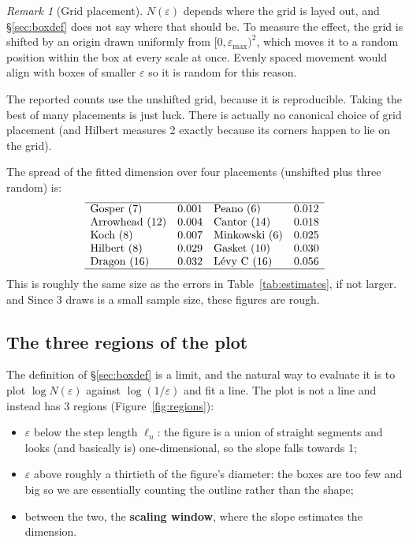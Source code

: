 \documentclass[11pt, a4paper]{article}
\theoremstyle{plain}
\theoremstyle{definition}
\theoremstyle{remark}
\newtheorem{remark}[theorem]{Remark}
\newcommand{\eps}{\varepsilon}
\begin{document}
\begin{remark}[Grid placement]
\label{rem:offsets}
    $N(\eps)$ depends where the grid is layed out, and \S\ref{sec:boxdef} does not say where that should be. 
    To measure the effect, the grid is shifted by an origin drawn uniformly from $[0,\eps_{\max})^2$, which moves it to a random
    position within the box at every scale at once. Evenly spaced movement would align with boxes of smaller $\eps$ so it is random for this reason.

    The reported counts use the unshifted grid, because it is reproducible. 
    Taking the best of many placements is just luck. There is actually no canonical choice of grid placement (and Hilbert measures 2 exactly because its corners happen to lie on the grid).

    \noindent The spread of the fitted dimension over four placements (unshifted plus
    three random) is:
    \[
      \begin{array}{lclc}
      \hline
      \text{Gosper (7)}    & 0.001 & \text{Peano (6)}     & 0.012\\
      \text{Arrowhead (12)}& 0.004 & \text{Cantor (14)}   & 0.018\\
      \text{Koch (8)}      & 0.007 & \text{Minkowski (6)} & 0.025\\
      \text{Hilbert (8)}   & 0.029 & \text{Gasket (10)}   & 0.030\\
      \text{Dragon (16)}   & 0.032 & \text{L\'evy C (16)} & 0.056\\
      \hline
      \end{array}
    \]
    This is roughly the same size as the errors in Table~\ref{tab:estimates}, if not larger. and
    Since 3 draws is a small sample size, these figures are rough.
\end{remark}

\subsection{The three regions of the plot}
\label{sec:regions}

The definition of \S\ref{sec:boxdef} is a limit, and the natural way to evaluate it is to plot
$\log N(\eps)$ against $\log(1/\eps)$ and fit a line. The plot is not a line and instead has 3 regions (Figure~\ref{fig:regions}):

\begin{itemize}
    \item $\eps$ below the step length $\ell_n$: the figure is a union of
    straight segments and looks (and basically is) one-dimensional, so the slope falls towards 1;
    \item $\eps$ above roughly a thirtieth of the figure's diameter: the boxes are too few and big so we are essentially counting the outline rather than the shape;
    \item between the two, the \textbf{scaling window}, where the slope estimates the dimension.
\end{itemize}
\end{document}
